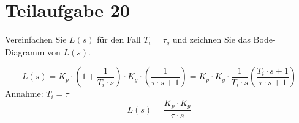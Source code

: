 \section{Teilaufgabe 20}
\begin{aufgabe}
Vereinfachen Sie $L(s)$ für den Fall $T_i = \tau_g$ und zeichnen Sie das 
Bode-Diagramm von $L(s)$.
\end{aufgabe}
\[ L(s) = K_p \cdot \left(1 + \frac{1}{T_i \cdot s}\right)
    \cdot K_g \cdot \left(\frac{1}{\tau \cdot s + 1}\right)
    = K_p \cdot K_g \cdot \frac{1}{T_i \cdot s} 
        \left(\frac{T_i \cdot s + 1}{\tau \cdot s + 1}\right)
\]
Annahme: $T_i = \tau$
\[ L(s) = \frac{K_p \cdot K_g}{\tau \cdot s} \]
